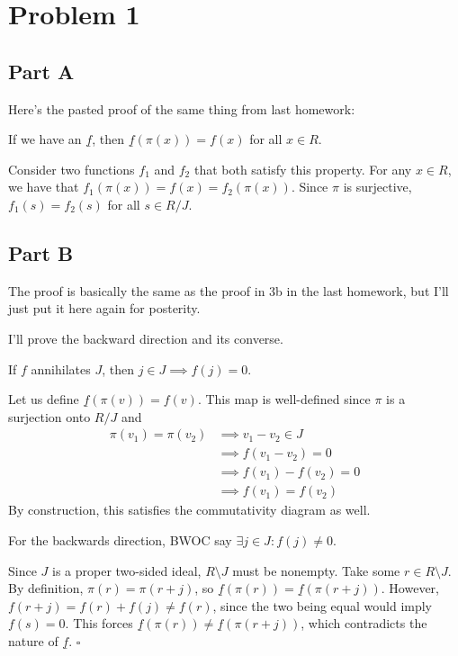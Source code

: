 \documentclass[12pt]{article}
\begin{document}
\section{Problem 1}

\subsection{Part A}\label{sec:p1a}

Here's the pasted proof of the same thing from last homework:

{
\color{blue}
If we have an $\underline{f}$, then $\underline{f}(\pi(x))=f(x)$ for all $x \in R$.

Consider two functions $f_1$ and $f_2$ that both satisfy this property.
For any $x \in R$, we have that $f_1(\pi(x))=f(x)=f_2(\pi(x))$.
Since $\pi$ is surjective, $f_1(s)=f_2(s)$ for all $s \in R/J$.
}

\subsection{Part B}\label{sec:p1b}

The proof is basically the same as the proof in 3b in the last homework,
but I'll just put it here again for posterity.

I'll prove the backward direction and its converse.

If $f$ annihilates $J$, then $j \in J \implies f(j)=0$.

Let us define $\underline{f}(\pi(v))=f(v)$.
This map is well-defined since $\pi$ is a surjection onto $R/J$ and
\begin{align*}
    \pi(v_1)=\pi(v_2)
        & \implies v_1-v_2 \in J   \\
        & \implies f(v_1-v_2)=0    \\
        & \implies f(v_1)-f(v_2)=0 \\
        & \implies f(v_1)=f(v_2)
\end{align*}
By construction, this satisfies the commutativity diagram as well.

For the backwards direction, BWOC say $\exists j \in J: f(j) \ne 0$.

Since $J$ is a proper two-sided ideal, $R \setminus J$ must be nonempty.
Take some $r \in R \setminus J$.
By definition, $\pi(r)=\pi(r + j)$, so $\underline{f}(\pi(r))=\underline{f}(\pi(r+j))$.
However, $f(r+j)=f(r)+f(j) \ne f(r)$, since the two
being equal would imply $f(s)=0$.
This forces $\underline{f}(\pi(r)) \ne \underline{f}(\pi(r+j))$,
which contradicts the nature of $\underline{f}$. $\square$
\end{document}

